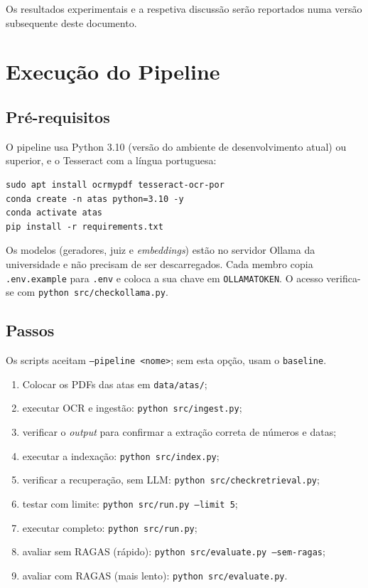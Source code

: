 \documentclass[11pt]{article}
\renewcommand{\_}{\textunderscore\allowbreak}
\begin{document}
Os resultados experimentais e a respetiva discussão serão reportados numa versão subsequente deste documento.

\appendix

\section{Execução do Pipeline}
\label{sec:execucao}

\subsection{Pré-requisitos}

O pipeline usa Python 3.10 (versão do ambiente de desenvolvimento atual) ou superior, e o Tesseract com a língua portuguesa:
\begin{verbatim}
sudo apt install ocrmypdf tesseract-ocr-por
conda create -n atas python=3.10 -y
conda activate atas
pip install -r requirements.txt
\end{verbatim}

Os modelos (geradores, juiz e \textit{embeddings}) estão no servidor Ollama da universidade e não precisam de ser descarregados. Cada membro copia \texttt{.env.example} para \texttt{.env} e coloca a sua chave em \texttt{OLLAMA\_TOKEN}. O acesso verifica-se com \texttt{python src/check\_ollama.py}.

\subsection{Passos}

Os scripts aceitam \texttt{--pipeline <nome>}; sem esta opção, usam o \texttt{baseline}.

\begin{enumerate}
    \item Colocar os PDFs das atas em \texttt{data/atas/};
    \item executar OCR e ingestão: \texttt{python src/ingest.py};
    \item verificar o \textit{output} para confirmar a extração correta de números e datas;
    \item executar a indexação: \texttt{python src/index.py};
    \item verificar a recuperação, sem LLM: \texttt{python src/check\_retrieval.py};
    \item testar com limite: \texttt{python src/run.py --limit 5};
    \item executar completo: \texttt{python src/run.py};
    \item avaliar sem RAGAS (rápido): \texttt{python src/evaluate.py --sem-ragas};
    \item avaliar com RAGAS (mais lento): \texttt{python src/evaluate.py}.
\end{enumerate}
\end{document}
